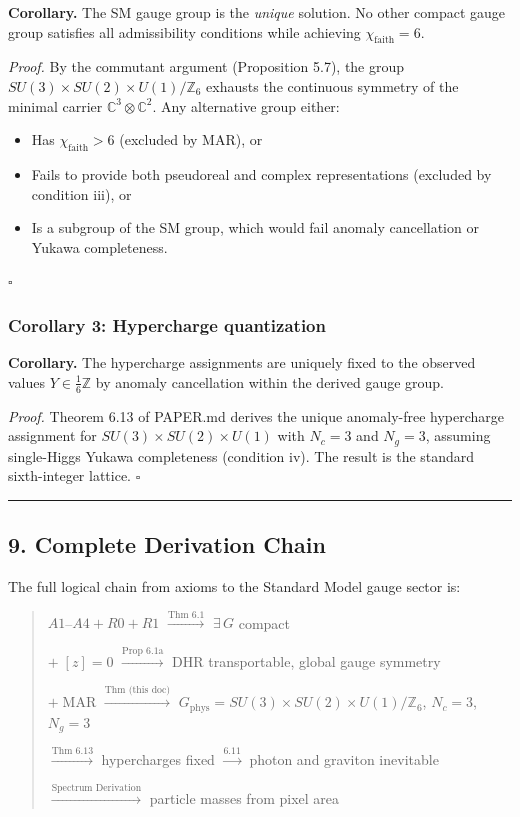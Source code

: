 \textbf{Corollary.} The SM gauge group is the \emph{unique} solution. No other compact gauge group satisfies all admissibility conditions while achieving \(\chi_{\mathrm{faith}} = 6\).

\emph{Proof.} By the commutant argument (Proposition 5.7), the group \(SU(3) \times SU(2) \times U(1)/\mathbb{Z}_6\) exhausts the continuous symmetry of the minimal carrier \(\mathbb{C}^3 \otimes \mathbb{C}^2\). Any alternative group either:

\begin{itemize}
\tightlist
\item
  Has \(\chi_{\mathrm{faith}} > 6\) (excluded by MAR), or
\item
  Fails to provide both pseudoreal and complex representations (excluded by condition iii), or
\item
  Is a subgroup of the SM group, which would fail anomaly cancellation or Yukawa completeness.
\end{itemize}

\(\square\)

\subsubsection{Corollary 3: Hypercharge quantization}\label{corollary-3-hypercharge-quantization}

\textbf{Corollary.} The hypercharge assignments are uniquely fixed to the observed values \(Y \in \frac{1}{6}\mathbb{Z}\) by anomaly cancellation within the derived gauge group.

\emph{Proof.} Theorem 6.13 of PAPER.md derives the unique anomaly-free hypercharge assignment for \(SU(3) \times SU(2) \times U(1)\) with \(N_c = 3\) and \(N_g = 3\), assuming single-Higgs Yukawa completeness (condition iv). The result is the standard sixth-integer lattice. \(\square\)

\begin{center}\rule{0.5\linewidth}{0.5pt}\end{center}

\subsection{9. Complete Derivation Chain}\label{9-complete-derivation-chain}

The full logical chain from axioms to the Standard Model gauge sector is:

\begin{quote}
\(A1\)--\(A4 + R0 + R1\) \(\xrightarrow{\text{Thm 6.1}}\) \(\exists\, G\) compact

\(+ \; [z]=0\) \(\xrightarrow{\text{Prop 6.1a}}\) DHR transportable, global gauge symmetry

\(+ \;\text{MAR}\) \(\xrightarrow{\text{Thm (this doc)}}\) \(G_{\mathrm{phys}} = SU(3) \times SU(2) \times U(1)/\mathbb{Z}_6\), \(N_c = 3\), \(N_g = 3\)

\(\xrightarrow{\text{Thm 6.13}}\) hypercharges fixed \(\xrightarrow{\text{6.11}}\) photon and graviton inevitable

\(\xrightarrow{\text{Spectrum Derivation}}\) particle masses from pixel area
\end{quote}

